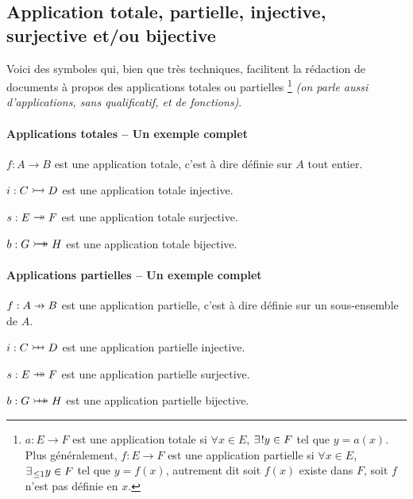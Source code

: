 \documentclass[12pt,a4paper]{article}
\begin{document}

\subsection{Application totale, partielle, injective, surjective et/ou bijective} \label{section:application}

Voici des symboles qui, bien que très techniques, facilitent la rédaction de documents à propos des applications totales ou partielles
\footnote{
	$a: E \to F$ est une application totale si $\forall x \in E$, $\exists\kern0.1em ! y \in F$ tel que $y = a(x)$. 
	Plus généralement, $f: E \to F$ est une application partielle si $\forall x \in E$, $\exists_{\kern0.1em \leq 1} y \in F$ tel que $y = f(x)$, autrement dit soit $f(x)$ existe dans $F$, soit $f$ n'est pas définie en $x$.
}
\emph{(on parle aussi d'applications, sans qualificatif, et de fonctions)}.




\paragraph{Applications totales -- Un exemple complet}

\begin{latexex-flat}
$f: A \to B$ est une application totale, c'est à dire définie sur $A$ tout entier.

$i: C \onetoone D$ est une application totale injective.

$s: E \onto F$ est une application totale surjective.

$b: G \biject H$ est une application totale bijective.
\end{latexex-flat}




\paragraph{Applications partielles -- Un exemple complet}

\begin{latexex-flat}
$f: A \pto B$ est une application partielle, c'est à dire définie sur
un sous-ensemble de $A$.

$i: C \ponetoone D$ est une application partielle injective.

$s: E \ponto F$ est une application partielle surjective.

$b: G \pbiject H$ est une application partielle bijective.
\end{latexex-flat}
\end{document}
